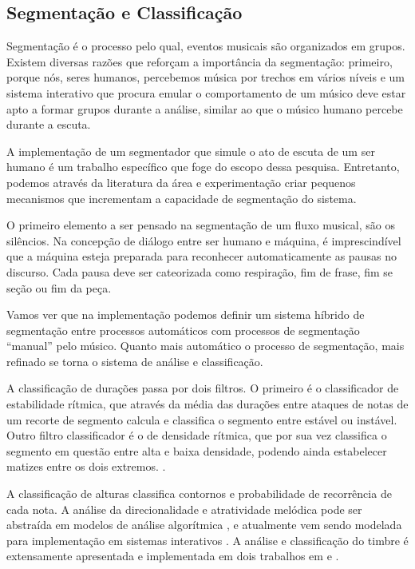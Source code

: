 \documentclass[draft]{ppgmus}
\begin{document}
\subsection{Segmentação e Classificação}


Segmentação é o processo pelo qual, eventos musicais são organizados
em grupos. Existem diversas razões que reforçam a importância da 
segmentação: primeiro, porque nós, seres humanos, percebemos música
por trechos em vários níveis e um sistema interativo que procura emular
o comportamento de um músico deve estar apto a formar grupos durante
a análise, similar ao que o músico humano percebe durante a escuta.

A implementação de um segmentador que simule o ato de escuta de um ser 
humano é um trabalho específico que foge do escopo dessa pesquisa. Entretanto,
podemos através da literatura da área e experimentação criar pequenos
mecanismos que incrementam a capacidade de segmentação do sistema.

O primeiro elemento a ser pensado na segmentação de um fluxo musical,
são os silêncios. Na concepção de diálogo entre ser humano e máquina,
é imprescindível que a máquina esteja preparada para reconhecer automaticamente
as pausas no discurso. Cada pausa deve ser cateorizada como respiração, fim de frase,
fim se seção ou fim da peça.

Vamos ver que na implementação podemos definir um sistema híbrido de segmentação
entre processos automáticos com processos de segmentação ``manual'' pelo músico.
Quanto mais automático o processo de segmentação, mais refinado se torna
o sistema de análise e classificação. 

A classificação de durações passa por dois filtros. O primeiro
é o classificador de estabilidade rítmica, que através da média das durações 
entre ataques de notas de um recorte de segmento calcula e classifica
o segmento entre estável ou instável.
Outro filtro classificador é o de densidade rítmica, que por sua vez classifica
o segmento em questão entre alta e baixa densidade, podendo ainda estabelecer
matizes entre os dois extremos. . 

A classificação de alturas classifica contornos e probabilidade de recorrência
de cada nota. A análise da direcionalidade e atratividade melódica pode ser abstraída
em modelos de análise algorítmica \cite{lerdahl2001}, e atualmente vem sendo modelada para 
implementação em sistemas interativos \cite{rickgrahan}.
A análise e classificação do timbre é extensamente apresentada e implementada em dois
trabalhos em \cite{brentcepstral} e \cite{monteiro}.
\end{document}

